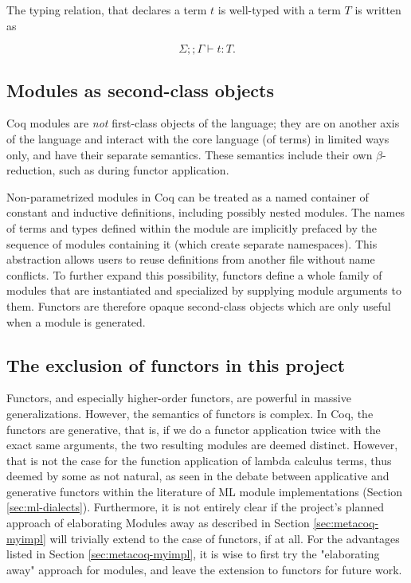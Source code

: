 The typing relation, that declares a term $t$ is well-typed with a term $T$ is
written as

\[\Sigma;;\Gamma\vdash t: T.\]

\subsection{Modules as second-class objects}

Coq modules are \emph{not} first-class objects of the language; they are on
another axis of the language and interact with the core language (of terms) in
limited ways only, and have their separate semantics. These semantics include
their own $\beta$-reduction, such as during functor application.

Non-parametrized modules in Coq can be treated as a named container of constant
and inductive definitions, including possibly nested modules. The names of terms
and types defined within the module are implicitly prefaced by the sequence of
modules containing it (which create separate namespaces). This abstraction
allows users to reuse definitions from another file without name conflicts. To
further expand this possibility, functors define a whole family of modules that
are instantiated and specialized by supplying module arguments to them. Functors
are therefore opaque second-class objects which are only useful when a module is
generated.

\subsection{The exclusion of functors in this project}
Functors, and especially higher-order functors, are powerful in massive
generalizations. However, the semantics of functors is complex. In Coq, the
functors are generative, that is, if we do a functor application twice with the
exact same arguments, the two resulting modules are deemed distinct. However,
that is not the case for the function application of lambda calculus terms, thus
deemed by some as not natural, as seen in the debate between applicative and
generative functors within the literature of ML module implementations (Section
\ref{sec:ml-dialects}). Furthermore, it is not entirely clear if the project's
planned approach of elaborating Modules away as described in Section
\ref{sec:metacoq-myimpl} will trivially extend to the case of functors, if at
all. For the advantages listed in Section \ref{sec:metacoq-myimpl}, it is wise
to first try the "elaborating away" approach for modules, and leave the
extension to functors for future work.

